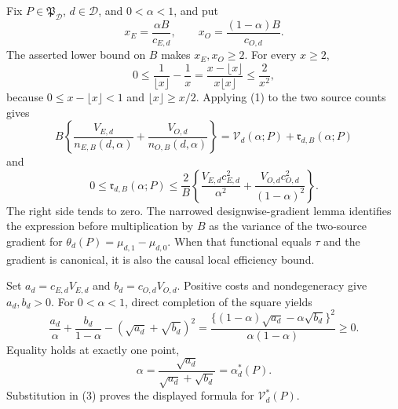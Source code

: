 Fix \(P\in\mathfrak P_{\mathcal D}\), \(d\in\mathcal D\), and \(0<\alpha<1\), and put
\[
 x_E=\frac{\alpha B}{c_{E,d}},\qquad
 x_O=\frac{(1-\alpha)B}{c_{O,d}}.
\]
The asserted lower bound on \(B\) makes \(x_E,x_O\ge2\).  For every \(x\ge2\),
\[
 0\le \frac1{\lfloor x\rfloor}-\frac1x
 =\frac{x-\lfloor x\rfloor}{x\lfloor x\rfloor}
 \le \frac2{x^2}, \tag{1}
\]
because \(0\le x-\lfloor x\rfloor<1\) and \(\lfloor x\rfloor\ge x/2\).  Applying (1) to the two source counts gives
\[
 B\left\{\frac{V_{E,d}}{n_{E,B}(d,\alpha)}
 +\frac{V_{O,d}}{n_{O,B}(d,\alpha)}\right\}
 =\mathcal V_d(\alpha;P)+\mathfrak r_{d,B}(\alpha;P)
\]
and
\[
 0\le\mathfrak r_{d,B}(\alpha;P)
 \le\frac2B\left\{
 \frac{V_{E,d}c_{E,d}^2}{\alpha^2}
 +\frac{V_{O,d}c_{O,d}^2}{(1-\alpha)^2}\right\}. \tag{2}
\]
The right side tends to zero.  The narrowed designwise-gradient lemma identifies the expression before multiplication by \(B\) as the variance of the two-source gradient for \(\theta_d(P)=\mu_{d,1}-\mu_{d,0}\).  When that functional equals \(\tau\) and the gradient is canonical, it is also the causal local efficiency bound.

Set \(a_d=c_{E,d}V_{E,d}\) and \(b_d=c_{O,d}V_{O,d}\).  Positive costs and nondegeneracy give \(a_d,b_d>0\).  For \(0<\alpha<1\), direct completion of the square yields
\[
 \frac{a_d}{\alpha}+\frac{b_d}{1-\alpha}
 -(\sqrt{a_d}+\sqrt{b_d})^2
 =\frac{\{(1-\alpha)\sqrt{a_d}-\alpha\sqrt{b_d}\}^2}
        {\alpha(1-\alpha)}\ge0. \tag{3}
\]
Equality holds at exactly one point,
\[
 \alpha=\frac{\sqrt{a_d}}{\sqrt{a_d}+\sqrt{b_d}}
 =\alpha_d^*(P).
\]
Substitution in (3) proves the displayed formula for \(\mathcal V_d^*(P)\).